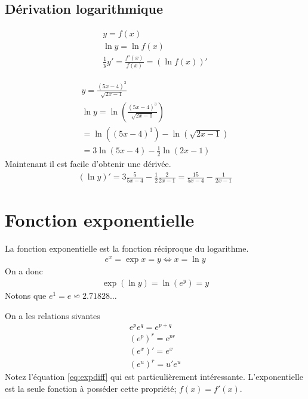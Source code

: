 \subsection{Dérivation logarithmique}
\begin{eqnarray*}
	y=f(x)
	\\
	\ln y=\ln f(x)
	\\
	\frac{1}{y}y'=\frac{f'(x)}{f(x)}=(\ln{f(x)})'
\end{eqnarray*}
\begin{myExample}
	\begin{eqnarray*}
		y=\frac{(5x-4)^3}{\sqrt{2x-1}}
		\\
		\ln{y}=\ln{\left(\frac{(5x-4)^3}{\sqrt{2x-1}}\right)}
		\\
		=\ln{\left((5x-4)^3\right)}-\ln{\left(\sqrt{2x-1}\right)}
		\\
		=3\ln{(5x-4)}-\frac{1}{2}\ln{(2x-1)}
	\end{eqnarray*}
	Maintenant il est facile d'obtenir une dérivée.
	\begin{eqnarray*}
		(\ln{y})'=3\frac{5}{5x-4}-\frac{1}{2}\frac{2}{2x-1}=\frac{15}{5x-4}-\frac{1}{2x-1}
	\end{eqnarray*}
\end{myExample}
\section{Fonction exponentielle}
\begin{myDefinition}
	La fonction exponentielle est la fonction réciproque du logarithme.
	\begin{eqnarray}
		e^x=\exp{x}=y \Leftrightarrow x=\ln y
	\end{eqnarray}
	On a donc 
	\begin{eqnarray}
		\exp{(\ln{y})}=\ln{(e^y)}=y
	\end{eqnarray}
	Notons que $e^1=e\backsimeq 2.71828\dots$
\end{myDefinition}
On a les relations sivantes
\begin{eqnarray}
	e^pe^q=e^{p+q}
	\\(e^{p})^r=e^{pr}
	\\
	\label{eq:expdiff}(e^x)'=e^x
	\\
	(e^u)^r=u'e^u
	\end{eqnarray}
Notez l'équation \ref{eq:expdiff} qui est particulièrement intéressante. L'exponentielle est la seule fonction à posséder cette propriété; $f(x)=f'(x)$.
